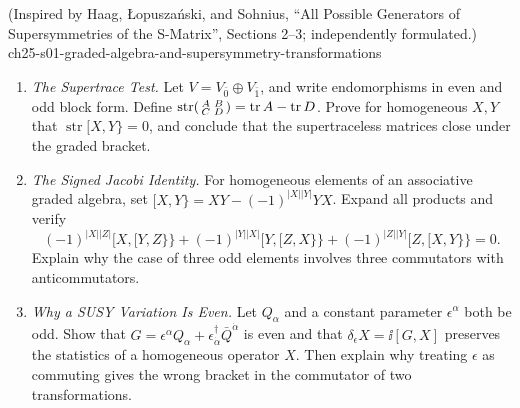 
\begin{enumerate}
    {(Inspired by Haag, {\L}opusza\'nski, and Sohnius, ``All Possible Generators of Supersymmetries of the S-Matrix'', Sections 2--3; independently formulated.)}
    {ch25-s01-graded-algebra-and-supersymmetry-transformations}
  \begin{enumerate}
    \item \emph{The Supertrace Test.}
    Let \(V=V_{\bar0}\oplus V_{\bar1}\), and write endomorphisms in even and
      odd block form.  Define
      \(\operatorname{str}\begin{psmallmatrix}A&B\\C&D\end{psmallmatrix}
      =\operatorname{tr}A-\operatorname{tr}D\).
      Prove for homogeneous \(X,Y\) that
      \(\operatorname{str}[X,Y\}=0\), and conclude that the supertraceless
      matrices close under the graded bracket.
    \item \emph{The Signed Jacobi Identity.}
    For homogeneous elements of an associative graded algebra, set
      \([X,Y\}=XY-(-1)^{|X||Y|}YX\).  Expand all products and verify
      \[
        (-1)^{|X||Z|}[X,[Y,Z\}\}
        +(-1)^{|Y||X|}[Y,[Z,X\}\}
        +(-1)^{|Z||Y|}[Z,[X,Y\}\}=0.
      \]
      Explain why the case of three odd elements involves three
      commutators with anticommutators.
    \item \emph{Why a SUSY Variation Is Even.}
    Let \(Q_\alpha\) and a constant parameter \(\epsilon^\alpha\) both be
      odd.  Show that \(G=\epsilon^\alpha Q_\alpha+
      \epsilon^\dagger_{\dot\alpha}\bar Q^{\dot\alpha}\) is even and that
      \(\delta_\epsilon X=\ii[G,X]\) preserves the statistics of a homogeneous
      operator \(X\).  Then explain why treating \(\epsilon\) as commuting
      gives the wrong bracket in the commutator of two transformations.
  \end{enumerate}


\end{enumerate}
